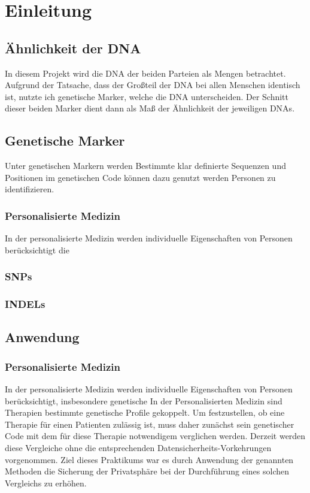 \chapter{Einleitung}
\label{sec:Chapter1}


\section{Ähnlichkeit der DNA}
In diesem Projekt wird die DNA der beiden Parteien als Mengen betrachtet.
Aufgrund der Tatsache, dass der Großteil der DNA bei allen Menschen identisch ist, nutzte ich genetische Marker, welche die DNA unterscheiden.
Der Schnitt dieser beiden Marker dient  dann als Maß der Ähnlichkeit  der jeweiligen DNAs.
\section{Genetische Marker}

Unter genetischen Markern werden Bestimmte klar definierte Sequenzen und Positionen im genetischen Code können dazu genutzt werden Personen zu identifizieren.

\subsection{Personalisierte Medizin}
In der personalisierte Medizin werden individuelle Eigenschaften von Personen berücksichtigt die  

\subsection{SNPs}

\subsection{INDELs}

\section{Anwendung}

\subsection{Personalisierte Medizin}
In der personalisierte Medizin werden individuelle Eigenschaften von Personen berücksichtigt, insbesondere genetische 
In der Personalisierten Medizin sind  Therapien bestimmte genetische Profile  gekoppelt.
Um festzustellen, ob eine Therapie für einen Patienten zulässig ist, muss daher zunächst sein genetischer Code mit dem für diese Therapie notwendigem verglichen werden.
Derzeit werden diese Vergleiche ohne die entsprechenden Datensicherheits-Vorkehrungen vorgenommen.
Ziel dieses Praktikums war es durch Anwendung der genannten Methoden die Sicherung der Privatsphäre bei der Durchführung eines solchen Vergleichs zu erhöhen.

